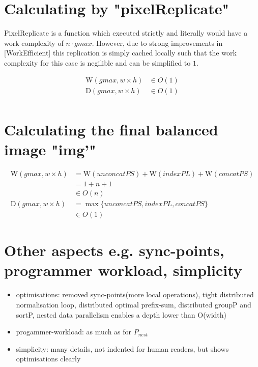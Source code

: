 \documentclass{article}
\newcommand{\ndpn}[0]{$P_{nest}$}
\newcommand{\W}[0]{\textrm{W}}
\newcommand{\D}[0]{\textrm{D}}
\begin{document}
    \section{Calculating by "pixelReplicate"}
      PixelReplicate is a function which executed strictly
      and literally would have a work complexity of $n \cdot gmax$.
      However, due to strong improvements in [WorkEfficient]
      this replication is simply cached locally such that
      the work complexity for this case is negilible and
      can be simplified to $1$.
      
      \begin{equation}
      \begin{split}
      \W(gmax,w \times h)
            & \in O(1) \\
      \D(gmax, w \times h)
            & \in O(1) \\
      \end{split}
      \end{equation}
      
    \section{Calculating the final balanced image "img'"}
      \begin{equation}
      \begin{split}
      \W(gmax, w \times h)
            & = \W(unconcatPS) + \W(indexPL) + \W(concatPS) \\
            & = 1 + n + 1 \\
            & \in O(n) \\
      \D(gmax, w \times h)
          & = \max \{ unconcatPS, indexPL, concatPS \} \\
          & \in O(1)
      \end{split}
      \end{equation}
      
    \section{Other aspects \small{e.g. sync-points, programmer workload, simplicity}}
      \begin{itemize}
        \item optimisations:
          removed sync-points(more local operations),
          tight distributed normalisation loop,
          distributed optimal prefix-sum,
          distributed groupP and sortP,
          nested data parallelism enables a depth lower than O(width)
        \item progammer-workload: as much as for \ndpn
        \item simplicity: many details, not indented for human readers, but shows optimisations clearly
      \end{itemize}
      
\end{document}
